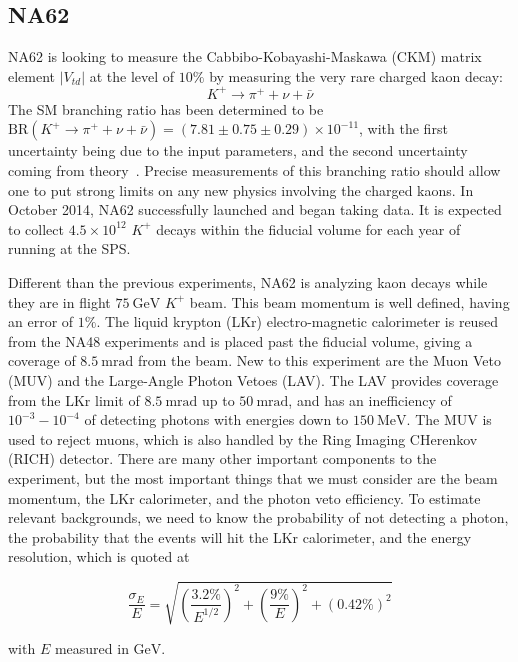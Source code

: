 \subsection{NA62}
NA62 is looking to measure the Cabbibo-Kobayashi-Maskawa (CKM) matrix element $|V_{td}|$ at the level of $10\%$ by measuring the very rare charged kaon decay:
\begin{equation}
K^+ \rightarrow \pi^+ + \nu + \bar{\nu}
\end{equation}
The SM branching ratio has been determined to be $\textrm{BR}(K^+ \rightarrow \pi^+ + \nu + \bar{\nu}) = (7.81 \pm 0.75 \pm 0.29) \times 10^{-11}$, with the first uncertainty being due to the input parameters, and the second uncertainty coming from theory~\cite{Straub:2010ih}.
Precise measurements of this branching ratio should allow one to put strong limits on any new physics involving the charged kaons.
In October 2014, NA62 successfully launched and began taking data.
It is expected to collect $4.5 \times 10^{12}$ $K^+$ decays within the fiducial volume for each year of running at the SPS\@.

Different than the previous experiments, NA62 is analyzing kaon decays while they are in flight $75~\textrm{GeV}$ $K^+$ beam.
This beam momentum is well defined, having an error of $1\%$.
The liquid krypton (LKr) electro-magnetic calorimeter is reused from the NA48 experiments and is placed past the fiducial volume, giving a coverage of $8.5~\textrm{mrad}$ from the beam.
New to this experiment are the Muon Veto (MUV) and the Large-Angle Photon Vetoes (LAV).
The LAV provides coverage from the LKr limit of $8.5~\textrm{mrad}$ up to $50~\textrm{mrad}$, and has an inefficiency of $10^{-3} - 10^{-4}$ of detecting photons with energies down to $150~\textrm{MeV}$.
The MUV is used to reject muons, which is also handled by the Ring Imaging CHerenkov (RICH) detector.
There are many other important components to the experiment, but the most important things that we must consider are the beam momentum, the LKr calorimeter, and the photon veto efficiency.
To estimate relevant backgrounds, we need to know the probability of not detecting a photon, the probability that the events will hit the LKr calorimeter, and the energy resolution, which is quoted at

\begin{equation}
\frac{\sigma_E}{E} = \sqrt{\left(\frac{3.2\%}{E^{1/2}}\right)^2 + \left(\frac{9\%}{E}\right)^2 + (0.42\%)^2}
\end{equation}

\noindent with $E$ measured in $\textrm{GeV}$.

